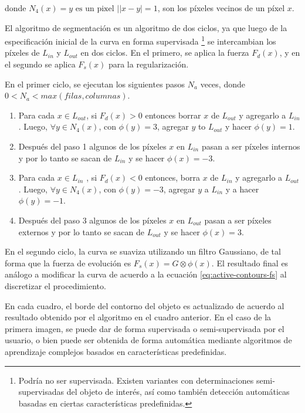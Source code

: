 \documentclass[a4paper,10pt]{article}
\begin{document}
donde $N_{4}(x) = { y \mbox{ es un pixel } | |x-y| = 1}$, son los píxeles
vecinos de un píxel $x$.

El algoritmo de segmentación es un algoritmo de dos ciclos, ya que luego de la
especificación inicial de la curva en forma supervisada \footnote{Podría no ser
supervisada. Existen variantes con determinaciones semi-supervisadas del objeto
de interés, así como también detección automáticas basadas en ciertas
características predefinidas.} se intercambian los píxeles de $L_{in}$ y
$L_{out}$ en dos ciclos. En el primero, se aplica la fuerza $F_{d}(x)$, y en el
segundo se aplica $F_{s}(x)$ para la regularización.

En el primer ciclo, se ejecutan los siguientes pasos $N_{a}$ veces, donde $ 0 <
N_{a} < max(filas, columnas)$.

\begin{enumerate}

    \item Para cada $x \in L_{out}$, si $F_{d}(x) > 0$ entonces borrar $x$ de
$L_{out}$ y agregarlo a $L_{in}$. Luego, $\forall y \in N_{4}(x)$, con $\phi(y)
= 3$, agregar $y$ to $L_{out}$ y hacer $\phi(y) = 1$.

    \item Después del paso 1 algunos de los píxeles $x$ en $L_{in}$ pasan a ser
píxeles internos y por lo tanto se sacan de $L_{in}$ y se hacer $\phi(x) = -3$.

    \item Para cada $x \in L_{in}$ , si $F_{d}(x) < 0$ entonces, borra $x$ de
$L_{in}$ y agregarlo a $L_{out}$. Luego, $\forall y \in N_{4}(x)$, con $\phi(y)
= -3$, agregar $y$ a $L_{in}$ y a hacer $\phi(y) = -1$.


    \item Después del paso 3 algunos de los píxeles $x$ en $L_{out}$ pasan a
ser píxeles externos y por lo tanto se sacan de $L_{out}$ y se hacer $\phi(x) =
3$.

\end{enumerate}

En el segundo ciclo, la curva se suaviza utilizando un filtro Gaussiano, de tal
forma que la fuerza de evolución es $F_{s}(x) = G \otimes \phi(x)$. El
resultado final es análogo a modificar la curva de acuerdo a la ecuación
\ref{eq:active-contours-fs} al discretizar el procedimiento.

En cada cuadro, el borde del contorno del objeto es actualizado de acuerdo al
resultado obtenido por el algoritmo en el cuadro anterior. En el caso de la
primera imagen, se puede dar de forma supervisada o semi-supervisada por el
usuario, o bien puede ser obtenida de forma automática mediante algoritmos de
aprendizaje complejos basados en características predefinidas.
\end{document}
